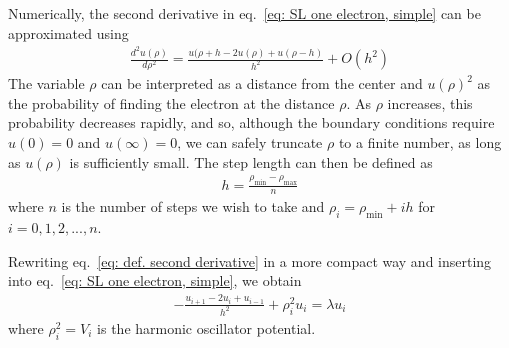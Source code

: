 \documentclass[11pt, a4paper]{article}
\begin{document}
			Numerically, the second derivative in eq.~\eqref{eq: SL one electron, simple} can be approximated using
			\begin{align}
				\frac{d^2u(\rho)}{d\rho^2} = \frac{u(\rho + h - 2u(\rho) + u(\rho - h)}{h^2} + O(h^2) \label{eq: def. second derivative}
			\end{align}
			The variable $\rho$ can be interpreted as a distance from the center and $u(\rho)^2$ as the probability of finding the electron at the distance $\rho$. As $\rho$ increases, this probability decreases rapidly, and so, although the boundary conditions require $u(0)=0$ and $u(\infty)=0$, we can safely truncate $\rho$ to a finite number, as long as $u(\rho)$ is sufficiently small. The step length can then be defined as
			\begin{align*}
				h = \frac{\rho_\mathrm{min} - \rho_\mathrm{max}}{n}
			\end{align*}
			where $n$ is the number of steps we wish to take and $\rho_i = \rho_\mathrm{min} + ih$ for $i=0, 1, 2, ..., n$.
			
			Rewriting eq.~\ref{eq: def. second derivative} in a more compact way and inserting into eq.~\ref{eq: SL one electron, simple}, we obtain
			\begin{align*}
				-\frac{u_{i+1} - 2u_i + u_{i-1}}{h^2} + \rho_i^2u_i = \lambda u_i
			\end{align*}
			where $\rho_i^2=V_i$ is the harmonic oscillator potential.
			
\end{document}

